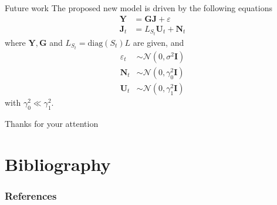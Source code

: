\documentclass[progressbar=head]{beamer}
\newcommand{\ppar}[1]{ \left( #1 \right) }
\newcommand{\J}{\mathbf{J}}
\newcommand{\Y}{\mathbf{Y}}
\newcommand{\G}{\mathbf{G}}
\newcommand{\U}{\mathbf{U}}
\newcommand{\N}{\mathbf{N}}
\newcommand{\id}{\mathbf{I}}
\newcommand{\norm}{\mathcal{N}}
\begin{document}
\begin{frame}{Future work}
The proposed new model is driven by the following equations
\begin{align}
    \Y &= \G \J + \varepsilon \\
    \J_t &=  L_{S_t} \U_t + \N_t
\end{align}
where $\Y, \G$ and $L_{S_t} = \text{diag}\ppar{S_t} L$ are given, and
\begin{align}
    \varepsilon_t &\sim  \norm\ppar{0, \sigma^2 \id } \\
    \N_t &\sim  
    \norm\ppar{0, \gamma_0^2 \id } \\
    \U_t &\sim  
    \norm\ppar{0, \gamma_1^2 \id } 
\end{align}
with $\gamma_0^2 \ll \gamma_1^2$.
\end{frame}

\begin{frame}{Thanks for your attention}

\end{frame}

{
\section{Bibliography}
}

\begin{frame}[allowframebreaks]
        \frametitle{References}
\end{frame}
\end{document}
